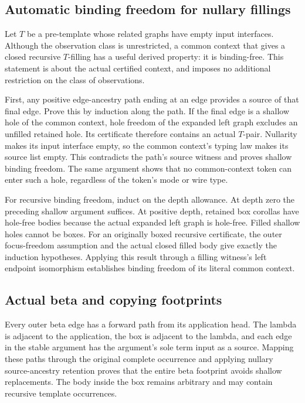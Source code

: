 \subsection{Automatic binding freedom for nullary fillings}
Let $T$ be a pre-template whose related graphs have empty input interfaces.
Although the observation class is unrestricted, a common context that gives
a closed recursive $T$-filling has a useful derived property: it is
binding-free. This statement is about the actual certified context, and
imposes no additional restriction on the class of observations.

First, any positive edge-ancestry path ending at an edge provides a source
of that final edge. Prove this by induction along the path. If the final
edge is a shallow hole of the common context, hole freedom of the expanded
left graph excludes an unfilled retained hole. Its certificate therefore
contains an actual $T$-pair. Nullarity makes its input interface empty,
so the common context's typing law makes its source list empty. This
contradicts the path's source witness and proves shallow binding freedom.
The same argument shows that no common-context token can enter such a hole,
regardless of the token's mode or wire type.

For recursive binding freedom, induct on the depth allowance. At depth
zero the preceding shallow argument suffices. At positive depth, retained
box corollas have hole-free bodies because the actual expanded left graph
is hole-free. Filled shallow holes cannot be boxes. For an originally boxed
recursive certificate, the outer focus-freedom assumption and the actual
closed filled body give exactly the induction hypotheses. Applying this
result through a filling witness's left endpoint isomorphism establishes
binding freedom of its literal common context.

\subsection{Actual beta and copying footprints}
Every outer beta edge has a forward path from its application head. The
lambda is adjacent to the application, the box is adjacent to the lambda,
and each edge in the stable argument has the argument's sole term input
as a source. Mapping these paths through the original complete occurrence
and applying nullary source-ancestry retention proves that the entire beta
footprint avoids shallow replacements. The body inside the box remains
arbitrary and may contain recursive template occurrences.

